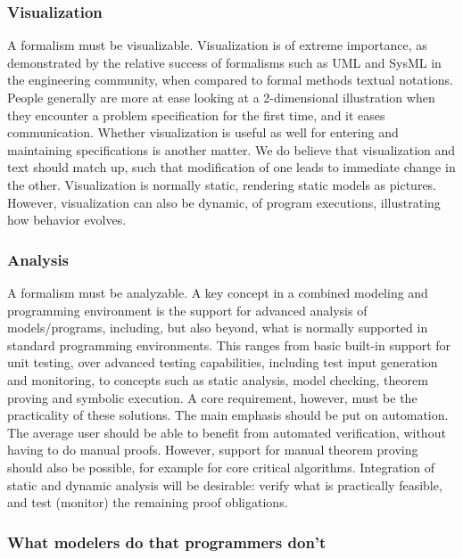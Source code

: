 \subsubsection{Visualization}

A formalism must be visualizable.
Visualization is of extreme importance, as demonstrated by the 
relative success of formalisms such as UML and SysML in the 
engineering community, when compared 
to formal methods textual notations. People generally are more at 
ease looking at a 2-dimensional illustration when they encounter a 
problem specification for the first
time, and it eases communication. Whether visualization is useful 
as well for entering
and maintaining specifications is another matter. We do believe 
that visualization and 
text should match up, such that modification of one leads to 
immediate change in the 
other. Visualization is normally static, rendering static models as
pictures. However, visualization can also be dynamic, of program 
executions, illustrating how behavior evolves.

\subsubsection{Analysis}

A formalism must be analyzable.
A key concept in a combined modeling and programming environment is 
the support for advanced analysis of models/programs, including, 
but also beyond, what is normally supported in standard programming 
environments. This ranges from basic built-in support for unit 
testing, over advanced testing capabilities, including test input 
generation and monitoring, to concepts such as static analysis, 
model checking, theorem proving and symbolic execution. A core 
requirement, however, must be the practicality of these solutions. 
The main emphasis should be put on automation. The average user 
should be able to benefit from automated verification, without 
having to do manual proofs. However, support for manual theorem 
proving should also be possible, for example for core critical 
algorithms. Integration of static and dynamic analysis will be 
desirable: verify what is practically feasible, and test (monitor) 
the remaining proof obligations.

\subsubsection{What modelers do that programmers don't}

